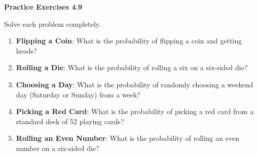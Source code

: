  \vspace{0.3ex}
\noindent\textbf{Practice Exercises 4.9}

\vspace{0.2ex}

Solve each problem completely.
\begin{enumerate}[noitemsep, label = \color{blue}\arabic*. ]
    \item \textbf{Flipping a Coin}: What is the probability of flipping a coin and getting heads?
    
    \item \textbf{Rolling a Die}: What is the probability of rolling a six on a six-sided die?
    
    \item \textbf{Choosing a Day}: What is the probability of randomly choosing a weekend day (Saturday or Sunday) from a week?
    
    \item \textbf{Picking a Red Card}: What is the probability of picking a red card from a standard deck of 52 playing cards?
    
    \item \textbf{Rolling an Even Number}: What is the probability of rolling an even number on a six-sided die?
    
    
    
    
    
\end{enumerate}

